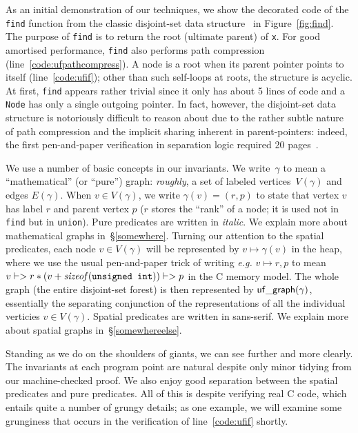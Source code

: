

As an initial demonstration of our techniques, we show the decorated code of the \texttt{find} function from the classic disjoint-set data structure~\cite{CLRS} in Figure~\ref{fig:find}.  The purpose of \texttt{find} is to return the root (ultimate parent) of \texttt{x}. For good amortised performance, \texttt{find} also performs path compression (line~\ref{code:ufpathcompress}).  A node is a root when its parent pointer points to itself (line~\ref{code:ufif}); other than such self-loops at roots, the structure is acyclic.  At first, \texttt{find} appears rather trivial since it only has about 5 lines of code and a \texttt{Node} has only a single outgoing pointer.  In fact, however, the disjoint-set data structure is notoriously difficult to reason about due to the rather subtle nature of path compression and the implicit sharing inherent in parent-pointers: indeed, the first pen-and-paper verification in separation logic required 20 pages~\cite{neelthesis}.

We use a number of basic concepts in our invariants.  We write~$\gamma$ to mean a ``mathematical'' (or ``pure'') graph: \emph{roughly}, a set of labeled vertices~$V(\gamma)$ and edges $E(\gamma)$.  When $v \in V(\gamma)$, we write $\gamma(v) = (r,p)$ to state that vertex $v$ has label $r$ and parent vertex $p$ ($r$ stores the ``rank'' of a node; it is used not in \texttt{find} but in \texttt{union}).  Pure predicates are written in \textit{italic}.  We explain more about mathematical graphs in~\S\ref{somewhere}. Turning our attention to the spatial predicates, each node $v \in V(\gamma)$ will be represented by $v \mapsto \gamma(v)$ in the heap, where we use the usual pen-and-paper trick of writing \emph{e.g.} $v \mapsto r,p$ to mean \mbox{$v |-> r * (v + \mathit{sizeof}(\texttt{unsigned int})) |-> p$} in the C memory model.  The whole graph (the entire disjoint-set forest) is then represented by $\mathsf{uf\_graph}(\gamma)$, essentially the separating conjunction of the representations of all the individual verticies $v \in V(\gamma)$.  Spatial predicates are written in \textsf{sans-serif}.  We explain more about spatial graphs in~\S\ref{somewhereelse}.

Standing as we do on the shoulders of giants, we can see further and more clearly.  The invariants at each program point are natural despite only minor tidying from our machine-checked proof.  We also enjoy good separation between the spatial predicates and pure predicates.  All of this is despite verifying real C code, which entails quite a number of grungy details; as one example, we will examine some grunginess that occurs in the verification of line~\ref{code:ufif} shortly.

